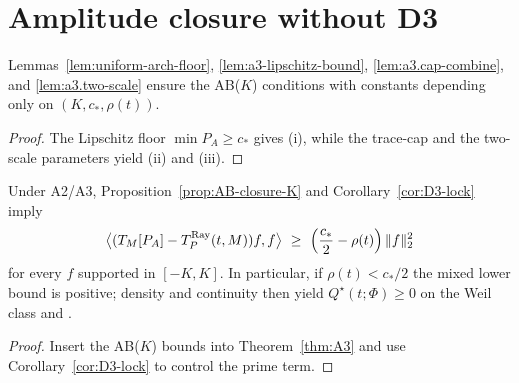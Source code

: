 \section*{Amplitude closure without D3}

\begin{proposition}[AB($K$) supplied by A3]\label{prop:AB-closure-K}
Lemmas~\ref{lem:uniform-arch-floor}, \ref{lem:a3-lipschitz-bound}, \ref{lem:a3.cap-combine}, and \ref{lem:a3.two-scale}
ensure the AB($K$) conditions with constants depending only on $(K,c_*,\rho(t))$.
\end{proposition}

\begin{proof}
The Lipschitz floor $\min P_A\ge c_*$ gives (i), while the trace-cap and the two-scale parameters yield (ii) and (iii).
\end{proof}

\begin{theorem}\label{thm:amp-noD3}
Under A2/A3, Proposition~\ref{prop:AB-closure-K} and Corollary~\ref{cor:D3-lock} imply
\[
  \big\langle (T_M[P_A]-T_P^{\mathrm{Ray}}(t,M))f,f\big\rangle\ \ge\ \Bigl(\frac{c_*}{2}-\rho(t)\Bigr)\,\|f\|_2^2
\]
for every $f$ supported in $[-K,K]$. In particular, if $\rho(t)<c_*/2$ the mixed lower bound is positive; density and continuity then yield $Q^\star(t;\Phi)\ge0$ on the Weil class and \WeilImpRH.
\end{theorem}

\begin{proof}
Insert the AB($K$) bounds into Theorem~\ref{thm:A3} and use Corollary~\ref{cor:D3-lock} to control the prime term.
\end{proof}
